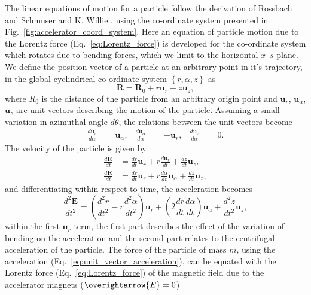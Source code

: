 \documentclass[../main.tex]{subfiles}
\begin{document}
The linear equations of motion for a particle follow the derivation of Rossbach and Schmuser \cite{rossbach1993basic} and K. Willie \cite{wille2000physics}, using the co-ordinate system presented in Fig.~\ref{fig:accelerator_coord_system}. Here an equation of particle motion due to the Lorentz force (Eq.~\ref{eq:Lorentz_force}) is developed for the co-ordinate system which rotates due to bending forces, which we limit to the horizontal $x$--$s$ plane. We define the position vector of a particle at an arbitrary point in it's trajectory, in the global cyclindrical co-ordinate system $\left\{r,\alpha,z\right\}$ as
\begin{equation}
\boldsymbol{R} = \boldsymbol{R}_{0} + r\boldsymbol{u}_{r} + z\boldsymbol{u}_{z},    
\label{eq:particle_position_vector}
\end{equation}
where $R_{0}$ is the distance of the particle from an arbitrary origin point and $\boldsymbol{u}_{r}$, $\boldsymbol{u}_{\alpha}$, $\boldsymbol{u}_{z}$ are unit vectors describing the motion of the particle. Assuming a small variation in azimuthal angle $d\theta$, the relations between the unit vectors become
\begin{align}
\frac{d\boldsymbol{u}_{r}}{d\alpha} &= \boldsymbol{u}_{\alpha}, & \frac{d\boldsymbol{u}_{\alpha}}{d\alpha} &= -\boldsymbol{u}_{r}, & \frac{d\boldsymbol{u}_{z}}{d\alpha} &= 0.
\label{eq:unit_vector_angular_derivatives}    
\end{align}
The velocity of the particle is given by
\begin{align}
\frac{d\boldsymbol{R}}{dt} &= \frac{dr}{dt}\boldsymbol{u}_{r}+r\frac{d\boldsymbol{u}_{r}}{dt} +\frac{dz}{dt}\boldsymbol{u}_{z}, \nonumber \\
\frac{d\boldsymbol{R}}{dt} &= \frac{dr}{dt}\boldsymbol{u}_{r} + r\frac{d\alpha}{dt}\boldsymbol{u}_{\alpha} + \frac{dz}{dt}\boldsymbol{u}_{z},
\label{eq:unit_vector_velocity}    
\end{align}
and differentiating within respect to time, the acceleration becomes
\begin{equation}
\frac{d^{2}\boldsymbol{E}}{dt^{2}} = \left(\frac{d^{2}r}{dt^{2}}-r\frac{d^{2}\alpha}{dt^{2}}\right)\boldsymbol{u}_{r} + \left(2\frac{dr}{dt}\frac{d\alpha}{dt}\right)\boldsymbol{u}_{\alpha} + \frac{d^{2}z}{dt^{2}}\boldsymbol{u}_{z},
\label{eq:unit_vector_acceleration}    
\end{equation}
within the first $\boldsymbol{u}_{r}$ term, the first part describes the effect of the variation of bending on the acceleration and the second part relates to the centrifugal acceleration of the particle. The force of the particle of mass $m$, using the acceleration (Eq.~\ref{eq:unit_vector_acceleration}), can be equated with the Lorentz force (Eq.~\ref{eq:Lorentz_force}) of the magnetic field due to the accelerator magnets ($\overightarrow{E}=0$)
\end{document}
